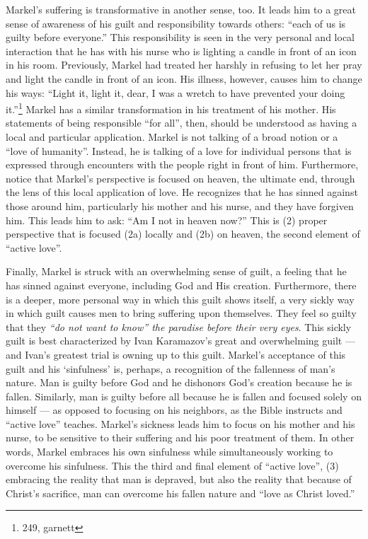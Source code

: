 Markel's suffering is transformative in another sense, too. It leads him to a great sense of awareness of his guilt and responsibility towards others: ``each of us is guilty before everyone.'' This responsibility is seen in the very personal and local interaction that he has with his nurse who is lighting a candle in front of an icon in his room. Previously, Markel had treated her harshly in refusing to let her pray and light the candle in front of an icon. His illness, however, causes him to change his ways: ``Light it, light it, dear, I was a wretch to have prevented your doing it.''\footnote{249, garnett} Markel has a similar transformation in his treatment of his mother. His statements of being responsible ``for all'', then, should be understood as having a local and particular application. Markel is not talking of a broad notion or a ``love of humanity''. Instead, he is talking of a love for individual persons that is expressed through encounters with the people right in front of him. Furthermore, notice that Markel's perspective is focused on heaven, the ultimate end, through the lens of this local application of love. He recognizes that he has sinned against those around him, particularly his mother and his nurse, and they have forgiven him. This leads him to ask: ``Am I not in heaven now?'' This is (2) proper perspective that is focused (2a) locally and (2b) on heaven, the second element of ``active love''.

Finally, Markel is struck with an overwhelming sense of guilt, a feeling that he has sinned against everyone, including God and His creation. Furthermore, there is a deeper, more personal way in which this guilt shows itself, a very sickly way in which guilt causes men to bring suffering upon themselves. They feel so guilty that they \emph{``do not want to know'' the paradise before their very eyes}. This sickly guilt is best characterized by Ivan Karamazov's great and overwhelming guilt --- and Ivan's greatest trial is owning up to this guilt. Markel's acceptance of this guilt and his `sinfulness' is, perhaps, a recognition of the fallenness of man's nature. Man is guilty before God and he dishonors God's creation because he is fallen. Similarly, man is guilty before all because he is fallen and focused solely on himself --- as opposed to focusing on his neighbors, as the Bible instructs and ``active love'' teaches. Markel's sickness leads him to focus on his mother and his nurse, to be sensitive to their suffering and his poor treatment of them. In other words, Markel embraces his own sinfulness while simultaneously working to overcome his sinfulness. This the third and final element of ``active love'', (3) embracing the reality that man is depraved, but also the reality that because of Christ's sacrifice, man can overcome his fallen nature and ``love as Christ loved.''


